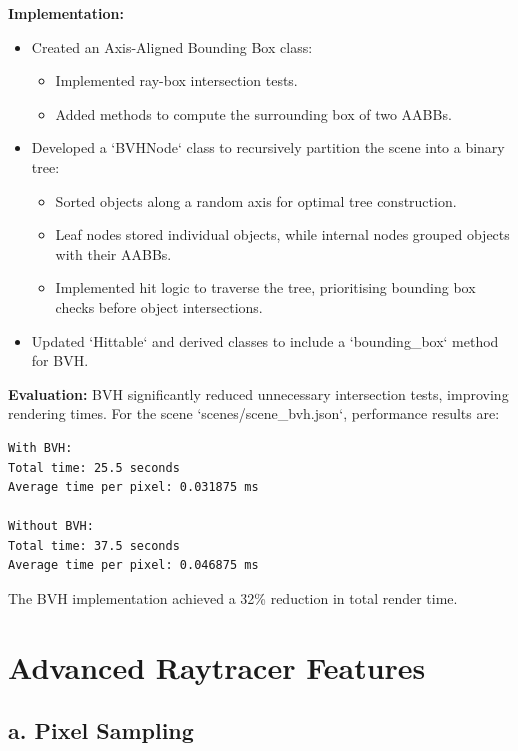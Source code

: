 \documentclass[11pt,a4paper]{article}
\begin{document}
\noindent\textbf{Implementation:}  
\begin{itemize}
    \item Created an Axis-Aligned Bounding Box class:  
    \begin{itemize}
        \item Implemented ray-box intersection tests.  
        \item Added methods to compute the surrounding box of two AABBs.  
    \end{itemize}  
    \item Developed a `BVHNode` class to recursively partition the scene into a binary tree:  
    \begin{itemize}
        \item Sorted objects along a random axis for optimal tree construction.  
        \item Leaf nodes stored individual objects, while internal nodes grouped objects with their AABBs.  
        \item Implemented hit logic to traverse the tree, prioritising bounding box checks before object intersections.  
    \end{itemize}  
    \item Updated `Hittable` and derived classes to include a `bounding\_box` method for BVH.  
\end{itemize}

\noindent\textbf{Evaluation:}  
BVH significantly reduced unnecessary intersection tests, improving rendering times. For the scene `scenes/scene\_bvh.json`, performance results are:  

\begin{verbatim}
With BVH:
Total time: 25.5 seconds
Average time per pixel: 0.031875 ms

Without BVH:
Total time: 37.5 seconds
Average time per pixel: 0.046875 ms
\end{verbatim}

The BVH implementation achieved a 32\% reduction in total render time.

\section{Advanced Raytracer Features}
\label{sec:advanced-raytracer}

\subsection{a. Pixel Sampling}  
\label{sec:pixel-sampling}
\end{document}
